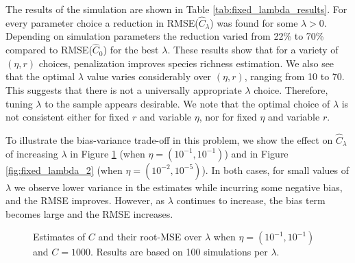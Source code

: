 \documentclass[12pt]{article}
\begin{document}
The results of the simulation are shown in Table \ref{tab:fixed_lambda_results}.  For every parameter choice a reduction in RMSE($\widehat{C}_{\lambda}$) was found for some $\lambda > 0$.  Depending on simulation parameters the reduction varied from 22\% to 70\% compared to RMSE($\widehat{C}_{0}$) for the best $\lambda$.  These results show that for a variety of $(\eta, r)$ choices, penalization improves species richness estimation.
We also see that the optimal $\lambda$ value varies considerably over $(\eta, r)$, ranging from 10 to 70.  This suggests that there is not a universally appropriate $\lambda$ choice. Therefore, tuning $\lambda$ to the sample appears desirable. We note that the optimal choice of $\lambda$ is not consistent either for fixed $r$ and variable $\eta$, nor for fixed $\eta$ and variable $r$.

To illustrate the bias-variance trade-off in this problem, we show the  effect on $\widehat{C}_{\lambda}$ of increasing $\lambda$ in Figure \ref{fig:fixed_lambda} (when $\eta = (10^{-1}, 10^{-1})$) and in Figure \ref{fig:fixed_lambda_2} (when $\eta = (10^{-2}, 10^{-5})$).
In both cases, for small values of $\lambda$ we observe lower variance in the estimates while incurring some negative bias, and the RMSE improves. However, as $\lambda$ continues to increase, the bias term becomes large and the RMSE increases.

\begin{figure}[p]
\caption{Estimates of $C$ and their root-MSE over $\lambda$ when $\eta = (10^{-1}, 10^{-1})$ and $C = 1000$. Results are based on 100 simulations per $\lambda$.
\label{fig:fixed_lambda}}
\centering{}
\end{figure}
\end{document}
